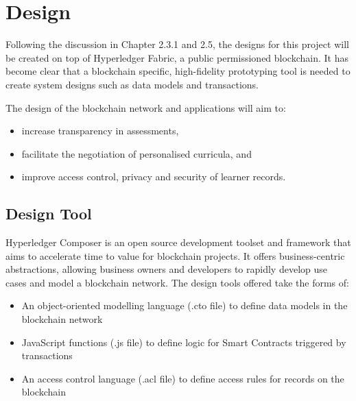 \chapter{Design}
\graphicspath{{Chapter5/Figs/Raster/}{Chapter5/Figs/Tex/}{Chapter5/Figs/}}

Following the discussion in Chapter 2.3.1 and 2.5, the designs for this project
will be created on top of Hyperledger Fabric, a public permissioned blockchain.
It has become clear that a blockchain specific, high-fidelity prototyping tool is needed
to create system designs such as data models and transactions.

The design of the blockchain network and applications will aim to:
\begin{itemize}
	\setlength\itemsep{0em}	
	\item increase transparency in assessments,
	\item facilitate the negotiation of personalised curricula, and
	\item improve access control, privacy and security of learner records.
\end{itemize}

\section{Design Tool}

Hyperledger Composer is an open source development toolset and framework that aims to
accelerate time to value for blockchain projects. It offers business-centric
abstractions, allowing business owners and developers to rapidly develop
use cases and model a blockchain network. The design tools offered take the forms of:
\begin{itemize}
	\setlength\itemsep{0em}
	\item An object-oriented modelling language (.cto file) to define data models in
	      the blockchain network
	\item JavaScript functions (.js file) to define logic for Smart Contracts triggered by transactions
	\item An access control language (.acl file) to define access rules for records on the blockchain\\
	      \citep{official2018composer}
\end{itemize}


